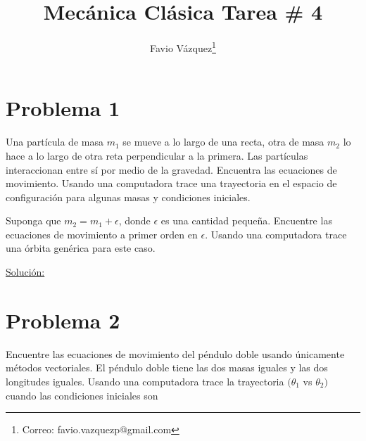 \documentclass[a4paper,10pt]{article}
\title{Mecánica Clásica Tarea \# 4}
\author{Favio Vázquez\thanks{Correo: favio.vazquezp@gmail.com}}\affil{Instituto de Ciencias Nucleares. Universidad Nacional Autónoma de México.}
\date{}
\numberwithin{equation}{section}
\begin{document}
\makeatletter
\def\@maketitle{%
  \newpage
  \null
  \vskip 2em%
  \begin{center}%
  \let \footnote \thanks
    {\Large\bfseries \@title \par}%
    \vskip 1.5em%
    {\normalsize
      \lineskip .5em%
      \begin{tabular}[t]{c}%
        \@author
      \end{tabular}\par}%
    \vskip 1em%
    {\normalsize \@date}%
  \end{center}%
  \par
  \vskip 1.5em}
\makeatother

\maketitle

\section{Problema 1}

Una partícula de masa $m_1$ se mueve a lo largo de una recta, otra de masa $m_2$ lo 
hace a lo largo de otra reta perpendicular a la primera. Las partículas interaccionan 
entre sí por medio de la gravedad. Encuentra las ecuaciones de movimiento. Usando 
una computadora trace una trayectoria en el espacio de configuración para algunas 
masas y condiciones iniciales.

\vspace{.3cm}

Suponga que $m_2=m_1+\epsilon$, donde $\epsilon$ es una cantidad pequeña. Encuentre 
las ecuaciones de movimiento a primer orden en $\epsilon$. Usando una computadora 
trace una órbita genérica para este caso.

\vspace{.3cm}

\underline{Solución:} \vspace{.3cm}


\section{Problema 2}

Encuentre las ecuaciones de movimiento del péndulo doble usando únicamente métodos 
vectoriales. El péndulo doble tiene las dos masas iguales y las dos longitudes iguales.
Usando una computadora trace la trayectoria $(\theta_1$ vs $\theta_2)$ cuando las 
condiciones iniciales son
\end{document}
